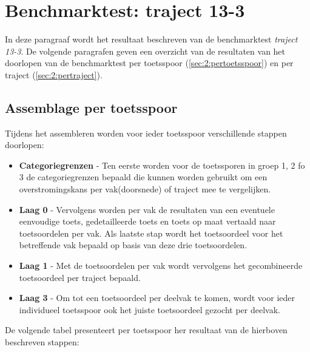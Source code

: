 \section{Benchmarktest: traject 13-3}
	\label{ch:benchmarktTest2}
In deze paragraaf wordt het resultaat beschreven van de benchmarktest \textit{traject 13-3}. De volgende paragrafen geven een overzicht van de resultaten van het doorlopen van de benchmarktest per toetsspoor (\autoref{sec:2:pertoetsspoor}) en per traject (\autoref{sec:2:pertraject}).

\subsection{Assemblage per toetsspoor}
	\label{sec:2:pertoetsspoor}
Tijdens het assembleren worden voor ieder toetsspoor verschillende stappen doorlopen:
\begin{itemize}
	\item \textbf{Categoriegrenzen} - Ten eerste worden voor de toetssporen in groep 1, 2 fo 3 de categoriegrenzen bepaald die kunnen worden gebruikt om een overstromingskans per vak(doorsnede) of traject mee te vergelijken.
	\item \textbf{Laag 0} - Vervolgens worden per vak de resultaten van een eventuele eenvoudige toets, gedetailleerde toets en toets op maat vertaald naar toetsoordelen per vak. Als laatste stap wordt het toetsoordeel voor het betreffende vak bepaald op basis van deze drie toetsoordelen.
	\item \textbf{Laag 1} - Met de toetsoordelen per vak wordt vervolgens het gecombineerde toetsoordeel per traject bepaald.
	\item \textbf{Laag 3} - Om tot een toetsoordeel per deelvak te komen, wordt voor ieder individueel toetsspoor ook het juiste toetsoordeel gezocht per deelvak.
\end{itemize}

De volgende tabel presenteert per toetsspoor her resultaat van de hierboven beschreven stappen:

